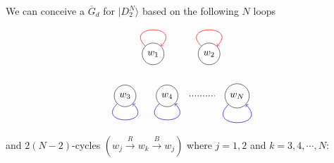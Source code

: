 \documentclass[a4paper,twocolumn,8pt,accepted=2021-12-15]{quantumarticle}
\def\>{\rangle}
\def\dc{{\overline{G}_d }}
\begin{document}
	We can conceive a $\dc$ for $|D_2^N\>$ based on the following $N$ loops
	\[\begin{tikzpicture}
		\node[circle,draw] (c) at (-2,0) {$w_3$};
		\node[circle,draw] (d) at (-0.5,0) {$w_4$};		
		\node[circle,draw] (e) at (2,0) {$w_{N}$};
		\node[circle,draw] (a) at (-1,1.5) {$w_{1}$};
		\node[circle,draw] (b) at (1,1.5) {$w_{2}$};
		\path[every loop/.style={min distance=10mm,in=45,out=135,looseness=5,color=red ,->},line width = 0.5pt] (a) edge [loop above]   (a);
		\path[every loop/.style={min distance=10mm,in=45,out=135,looseness=5,color=red ,->},line width = 0.5pt] (b) edge [loop above]   (b);
		\path[every loop/.style={min distance=10mm,in=-45,out=-135,looseness=5,color=blue ,->},line width = 0.5pt] (c) edge [loop above]  (c);
		\path[every loop/.style={min distance=10mm,in=-45,out=-135,looseness=5,color=blue ,->},line width = 0.5pt] (d) edge [loop above] (d);
		\path[every loop/.style={min distance=10mm,in=-45,out=-135,looseness=5,color=blue ,->},line width = 0.5pt] (e) edge [loop above]   (e);			
		\draw[thick, dotted] (0.3,0) -- (1.2,0) ;			
	\end{tikzpicture}\]	 
	and $2(N-2)$-cycles $(w_j\xrightarrow{R} w_k \xrightarrow{B} w_j)$ where $j=1,2$ and $k=3,4,\cdots ,N $:
\end{document}
